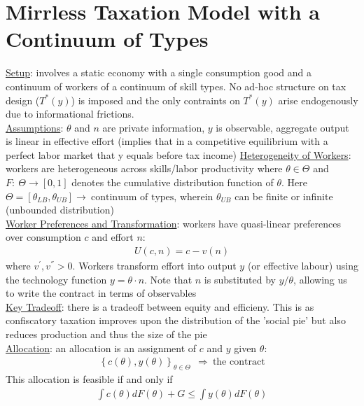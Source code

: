 \documentclass{article}
\begin{document}
\newpage
\section{Mirrless Taxation Model with a Continuum of Types}
\vspace{2.5mm}
\par \underline{Setup}: involves a static economy with a single consumption good and a continuum of workers of a continuum of skill types. No ad-hoc structure on tax design ($T^{*}(y)$) is imposed and the only contraints on $T^{*}(y)$ arise endogenously due to informational frictions.
\\ \underline{Assumptions}: $\theta$ and $n$ are private information, $y$ is observable, aggregate output is linear in effective effort (implies that in a competitive equilibrium with a perfect labor market that y equals before tax income)
\underline{Heterogeneity of Workers}: workers are heterogeneous across skills/labor productivity where $\theta \in \Theta$ and $F: \ \Theta \rightarrow [0,1]$ denotes the cumulative distribution function of $\theta$. Here $\Theta = [\theta_{LB}, \theta_{UB}] \rightarrow \ \text{continuum of types}$, wherein $\theta_{UB}$ can be finite or infinite (unbounded distribution)
\\ \underline{Worker Preferences and Transformation}: workers have quasi-linear preferences over consumption $c$ and effort $n$:
\begin{gather*}
    U(c,n) = c - v(n)
\end{gather*}
where $v^{'}, v^{''} > 0$. Workers transform effort into output $y$ (or effective labour) using the technology function $y = \theta \cdot n$. Note that $n$ is substituted by $y/\theta$, allowing us to write the contract in terms of observables
\\ \underline{Key Tradeoff}: there is a tradeoff between equity and efficieny. This is as confiscatory taxation improves upon the distribution of the 'social pie' but also reduces production and thus the size of the pie
\\ \underline{Allocation}: an allocation is an assignment of $c$ and $y$ given $\theta$:
\begin{gather*}
    \left\{ c(\theta), y(\theta) \right\}_{\theta \in \Theta} \ \ \Rightarrow \ \text{the contract}
\end{gather*}
This allocation is feasible if and only if
\begin{gather*}
    \int c(\theta) dF(\theta) + G \leq \int y(\theta) dF(\theta)
\end{gather*}
\end{document}
